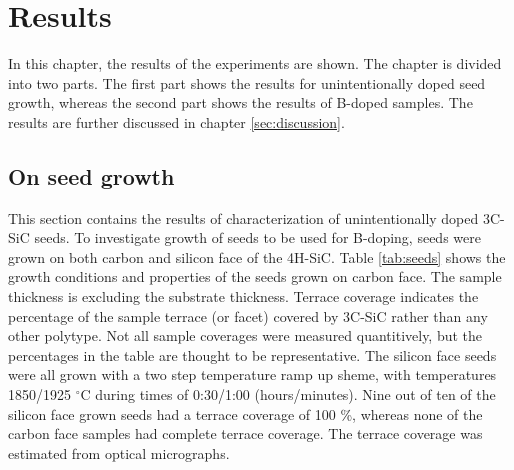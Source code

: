 

	
	

	
	

\chapter{Results}
\label{sec:results}
In this chapter, the results of the experiments are shown. The chapter is divided into two parts. The first part shows the results for unintentionally doped seed growth, whereas the second part shows the results of B-doped samples. The results are further discussed in chapter \ref{sec:discussion}. 

\section{On seed growth}
\label{sec:results:seeds}
This section contains the results of characterization of unintentionally doped 3C-SiC seeds. To investigate growth of seeds to be used for B-doping, seeds were grown on both carbon and silicon face of the 4H-SiC. Table \ref{tab:seeds} shows the growth conditions and properties of the seeds grown on carbon face. The sample thickness is excluding the substrate thickness. Terrace coverage indicates the percentage of the sample terrace (or facet) covered by 3C-SiC rather than any other polytype. Not all sample coverages were measured quantitively, but the percentages in the table are thought to be representative. The silicon face seeds were all grown with a two step temperature ramp up sheme, with temperatures 1850/1925 $^\circ$C during times of 0:30/1:00 (hours/minutes). Nine out of ten of the silicon face grown seeds had a terrace coverage of 100 \%, whereas none of the carbon face samples had complete terrace coverage. The terrace coverage was estimated from optical micrographs.

